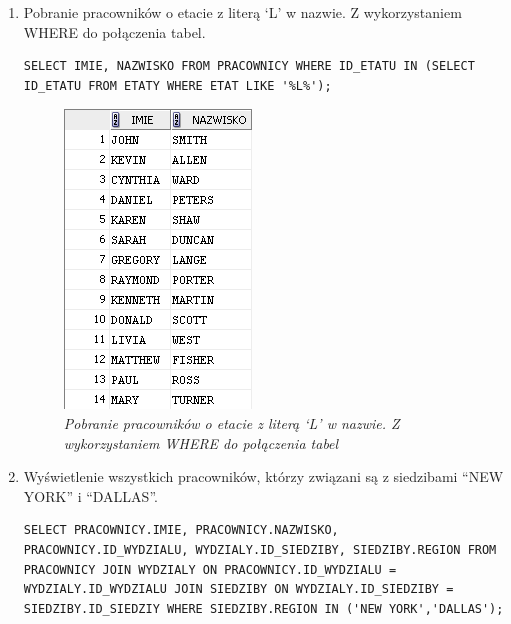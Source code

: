 \documentclass[a4paper, 10pt]{article}
\begin{document}
\begin{enumerate}
\item Pobranie pracowników o etacie z literą `L' w nazwie. Z wykorzystaniem WHERE do połączenia tabel. 
\begin{lstlisting}[style=SQL, caption=\textit{Pobranie pracowników o etacie z literą `L' w nazwie. Z wykorzystaniem WHERE do połączenia tabel}]
SELECT IMIE, NAZWISKO FROM PRACOWNICY WHERE ID_ETATU IN (SELECT ID_ETATU FROM ETATY WHERE ETAT LIKE '%L%');
\end{lstlisting}

\begin{figure}[H]
	\centering
	\includegraphics[scale=0.7]{zadanie12.png}
	\caption{\textit{Pobranie pracowników o etacie z literą `L' w nazwie. Z wykorzystaniem WHERE do połączenia tabel}}
\end{figure}


\item Wyświetlenie wszystkich pracowników, którzy związani są z siedzibami ``NEW YORK'' i ``DALLAS''. 
\begin{lstlisting}[style=SQL, caption=\textit{Wyświetlenie wszystkich pracowników, którzy związani są z siedzibami ``NEW YORK'' i ``DALLAS''}]
SELECT PRACOWNICY.IMIE, PRACOWNICY.NAZWISKO, PRACOWNICY.ID_WYDZIALU, WYDZIALY.ID_SIEDZIBY, SIEDZIBY.REGION FROM PRACOWNICY JOIN WYDZIALY ON PRACOWNICY.ID_WYDZIALU = WYDZIALY.ID_WYDZIALU JOIN SIEDZIBY ON WYDZIALY.ID_SIEDZIBY = SIEDZIBY.ID_SIEDZIY WHERE SIEDZIBY.REGION IN ('NEW YORK','DALLAS');
\end{lstlisting}


\end{enumerate}
\end{document}
